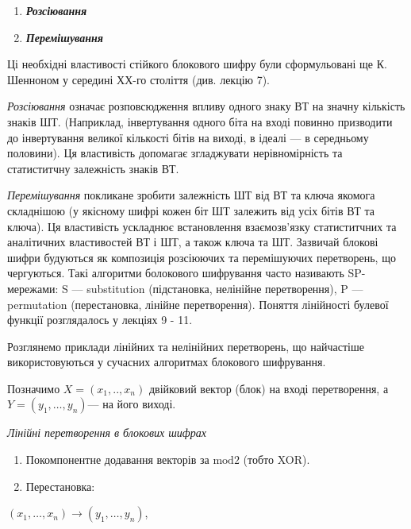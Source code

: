 \liststyleWWviiiNumlv
\begin{enumerate}
\item {\bfseries\itshape
Розсіювання}
\item {\bfseries\itshape
Перемішування}
\end{enumerate}
Ці необхідні властивості стійкого блокового шифру були сформульовані ще К.
Шенноном  у середині ХХ-го століття (див. лекцію 7). 

\textit{Розсіювання} означає розповсюдження впливу одного знаку ВТ на значну
кількість знаків ШТ. (Наприклад, інвертування одного біта на вході повинно
призводити до інвертування великої кількості бітів на виході, в ідеалі --- в
середньому половини). Ця властивість допомагає згладжувати нерівномірність та
статиститчну залежність знаків ВТ.\textit{ }

\textit{Перемішування} покликане зробити залежність ШТ від ВТ та ключа якомога
складнішою (у якісному шифрі кожен біт ШТ залежить від усіх бітів ВТ та ключа).
Ця властивість ускладнює встановлення взаємозв’язку статиститчних та
аналітичних властивостей ВТ і ШТ, а також ключа та ШТ. Зазвичай блокові шифри
будуються як\textbf{ }композиція  розсіюючих та\textbf{ }перемішуючих
перетворень, що чергуються. Такі алгоритми болокового шифрування часто
називають SP{}-мережами: S --- substitution (підстановка, нелінійне
перетворення), P --- permutation (перестановка, лінійне перетворення). Поняття
лінійності булевої функції розглядалось у лекціях 9 - 11.

Розглянемо приклади лінійних та нелінійних перетворень, що найчастіше
використовуються у сучасних алгоритмах блокового шифрування.

Позначимо  ${X=(x_{{1}},\text{.}\text{.},x_{{n}})}$ двійковий вектор (блок) на
вході перетворення, а   ${Y=(y_{{1}},\dots,y_{{n}})}$--- на
його виході.


\bigskip

{\centering\itshape
Лінійні перетворення в блокових шифрах
\par}


\bigskip

\liststyleWWviiiNumiii
\begin{enumerate}
\item Покомпонентне додавання векторів за  ${\text{mod}2}$ (тобто XOR).
\item Перестановка:
\end{enumerate}
{\centering
 ${(x_{{1}},\dots,x_{{n}})\rightarrow
(y_{{1}},\dots,y_{{n}})}$,
\par}

